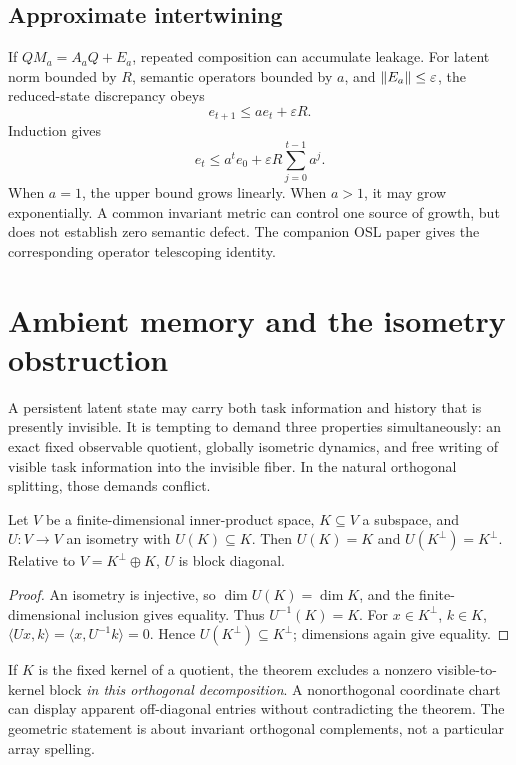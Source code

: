 \documentclass[11pt]{article}
\begin{document}
\subsection{Approximate intertwining}
If \(QM_a=A_aQ+E_a\), repeated composition can accumulate leakage. For latent norm bounded by \(R\), semantic operators bounded by \(a\), and \(\left\lVert E_a\right\rVert\le\varepsilon\), the reduced-state discrepancy obeys
\[
 e_{t+1}\le a e_t+\varepsilon R.
\]
Induction gives
\[
 e_t\le a^t e_0+\varepsilon R\sum_{j=0}^{t-1}a^j.
\]
When \(a=1\), the upper bound grows linearly. When \(a>1\), it may grow exponentially. A common invariant metric can control one source of growth, but does not establish zero semantic defect. The companion OSL paper gives the corresponding operator telescoping identity.

\section{Ambient memory and the isometry obstruction}
A persistent latent state may carry both task information and history that is presently invisible. It is tempting to demand three properties simultaneously: an exact fixed observable quotient, globally isometric dynamics, and free writing of visible task information into the invisible fiber. In the natural orthogonal splitting, those demands conflict.

\begin{theorem}\label{thm:isometry}
Let \(V\) be a finite-dimensional inner-product space, \(K\subseteq V\) a subspace, and \(U:V\to V\) an isometry with \(U(K)\subseteq K\). Then \(U(K)=K\) and \(U(K^\perp)=K^\perp\). Relative to \(V=K^\perp\oplus K\), \(U\) is block diagonal.
\end{theorem}
\begin{proof}
An isometry is injective, so \(\dim U(K)=\dim K\), and the finite-dimensional inclusion gives equality. Thus \(U^{-1}(K)=K\). For \(x\in K^\perp\), \(k\in K\),
\(\langle Ux,k\rangle=\langle x,U^{-1}k\rangle=0\). Hence \(U(K^\perp)\subseteq K^\perp\); dimensions again give equality.
\end{proof}
If \(K\) is the fixed kernel of a quotient, the theorem excludes a nonzero visible-to-kernel block \emph{in this orthogonal decomposition}. A nonorthogonal coordinate chart can display apparent off-diagonal entries without contradicting the theorem. The geometric statement is about invariant orthogonal complements, not a particular array spelling.
\end{document}
